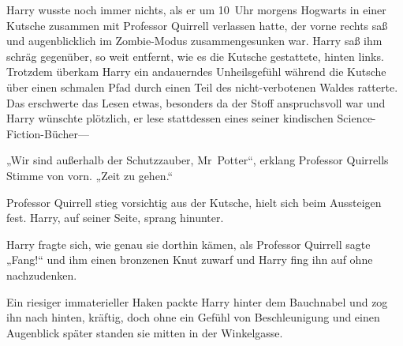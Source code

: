 Harry wusste noch immer nichts, als er um 10~Uhr morgens Hogwarts in einer Kutsche zusammen mit Professor Quirrell verlassen hatte, der vorne rechts saß und augenblicklich im Zombie-Modus zusammengesunken war. Harry saß ihm schräg gegenüber, so weit entfernt, wie es die Kutsche gestattete, hinten links. Trotzdem überkam Harry ein andauerndes Unheilsgefühl während die Kutsche über einen schmalen Pfad durch einen Teil des nicht-verbotenen Waldes ratterte. Das erschwerte das Lesen etwas, besonders da der Stoff anspruchsvoll war und Harry wünschte plötzlich, er lese stattdessen eines seiner kindischen Science-Fiction-Bücher—

„Wir sind außerhalb der Schutzzauber, Mr~Potter“, erklang Professor Quirrells Stimme von vorn. „Zeit zu gehen.“

Professor Quirrell stieg vorsichtig aus der Kutsche, hielt sich beim Aussteigen fest. Harry, auf seiner Seite, sprang hinunter.

Harry fragte sich, wie genau sie dorthin kämen, als Professor Quirrell sagte „Fang!“ und ihm einen bronzenen Knut zuwarf und Harry fing ihn auf ohne nachzudenken.

Ein riesiger immaterieller Haken packte Harry hinter dem Bauchnabel und zog ihn nach hinten, kräftig, doch ohne ein Gefühl von Beschleunigung und einen Augenblick später standen sie mitten in der Winkelgasse.

